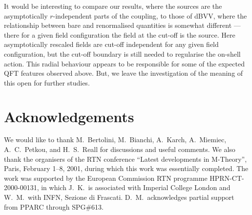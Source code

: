 \documentclass[a4paper,12pt]{article}
\begin{document}
It would be interesting to compare our results, where the sources are 
the asymptotically $r$-independent parts of the coupling, to those 
of  dBVV, where the relationship between bare and renormalised 
quantities is somewhat different \cite{deBoer00a}---there 
for a given field configuration the field at the 
cut-off is the source. Here asymptotically rescaled
fields are cut-off independent for any given field configuration, but 
the cut-off boundary is still needed to regularise the on-shell action. 
This radial behaviour appears to be responsible for some of the expected 
QFT features observed above. 
But, we leave the investigation of the meaning of this open for further
studies.



\section*{Acknowledgements}
We would like to thank M.~Bertolini, M.~Bianchi, A.~Karch, A.~Miemiec, 
A.~C.~Petkou, and H.~S.~Reall for discussions and useful comments. 
We also thank the 
organisers of the RTN conference ``Latest developments in M-Theory'', 
Paris, February 1--8, 2001, during which this work was essentially 
completed. 
The work was supported by the European Commission RTN programme
HPRN-CT-2000-00131, in which J.~K.\ is associated with Imperial
College London and W.~M.\ with INFN, Sezione di Frascati. D.~M.\
acknowledges partial support from PPARC through SPG\#613.
\end{document}
